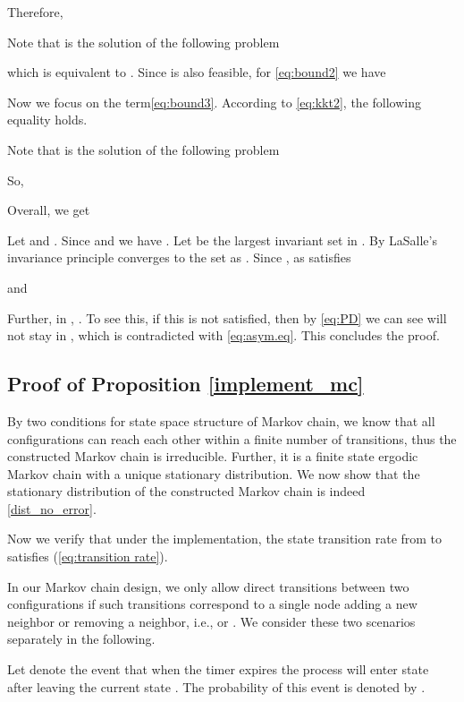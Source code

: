 \documentclass[10pt,conference]{IEEEtran}
\begin{document}
Therefore,


Note that  is the solution of the following problem


which is equivalent to . Since is
also feasible, for \eqref{eq:bound2} we have




Now we focus on the term\eqref{eq:bound3}. According to \eqref{eq:kkt2},
the following equality holds.

Note that  is the solution of the following problem


So, 


Overall, we get




Let 
and .
Since 
and 
we have . Let  be the
largest invariant set in . By LaSalle\textquoteright{}s
invariance principle  converges to
the set  as . Since ,
as   satisfies


and
\begin{small}

\end{small}
Further, in , . To see this, if this is not
satisfied, then by \eqref{eq:PD} we can see  will not stay in
, which is contradicted with \eqref{eq:asym.eq}. This
concludes the proof.


\subsection{Proof of Proposition \ref{implement_mc}}
\label{sec:proof_mc}
By two conditions for state space structure of Markov chain, we know
that all configurations can reach each other within a finite number
of transitions, thus the constructed Markov chain is irreducible.
Further, it is a finite state ergodic Markov chain with a unique
stationary distribution. We now show that the stationary
distribution of the constructed Markov chain is indeed
\eqref{dist_no_error}.

Now we verify that under the implementation, the state transition
rate from  to  satisfies (\ref{eq:transition rate}).

In our Markov chain design, we only allow direct transitions between two configurations
if such transitions correspond to a single node adding a new neighbor
or removing a neighbor, i.e.,  or . We consider these two scenarios
separately in the following.

Let  denote the event that when the timer expires
the process will enter state  after leaving the current state
. The probability of this event is denoted by .
\end{document}
